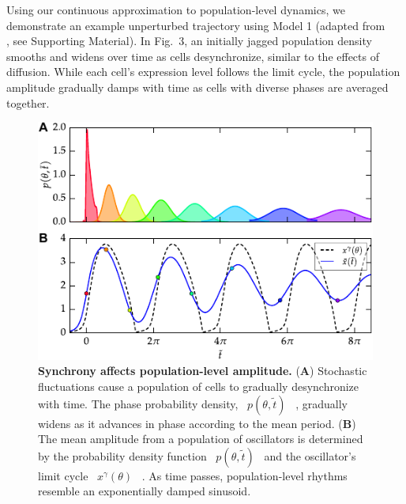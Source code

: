 \documentclass[11pt, letterpaper]{article}
\providecommand{\DIFadd}[1]{{\protect\color{blue}#1}} %
\providecommand{\DIFaddbegin}{} %
\providecommand{\DIFaddend}{} %
\providecommand{\DIFaddFL}[1]{\DIFadd{#1}} %
\providecommand{\DIFaddbeginFL}{} %
\providecommand{\DIFaddendFL}{} %
\begin{document}
\DIFadd{Using our continuous approximation to }\DIFaddend population-level \DIFaddbegin \DIFadd{dynamics, we demonstrate an example unperturbed trajectory using Model 1 (adapted from \mbox{%
\cite{Novak2008}
}%
, see Supporting Material).
In Fig.~3, an initially jagged population density smooths and widens over time as cells desynchronize, similar to }\DIFaddend the effects of \DIFaddbegin \DIFadd{diffusion.
While each cell's expression level follows the limit cycle, the population amplitude gradually damps with time as cells with diverse phases are averaged together}\DIFaddend .


\begin{figure}[tbp]
  \begin{center}
    \DIFaddbeginFL \includegraphics[width=.75\textwidth]{figures/figure_3.pdf}
    \DIFaddendFL \caption{
{\bfseries \DIFaddbeginFL \DIFaddFL{Synchrony affects population-level }\DIFaddendFL amplitude.\DIFaddbeginFL }
\DIFaddendFL ({\bfseries A}) \DIFaddbeginFL \DIFaddFL{Stochastic fluctuations cause a }\DIFaddendFL population \DIFaddbeginFL \DIFaddFL{of cells }\DIFaddendFL to \DIFaddbeginFL \DIFaddFL{gradually desynchronize with time}\DIFaddendFL .
The \DIFaddbeginFL \DIFaddFL{phase probability density}\DIFaddendFL , \DIFaddbeginFL \DIFaddFL{\mbox{%
$p(\theta, \tilde{t})$
}%
}\DIFaddendFL , \DIFaddbeginFL \DIFaddFL{gradually widens as it advances in phase according }\DIFaddendFL to the \DIFaddbeginFL \DIFaddFL{mean period}\DIFaddendFL .
({\bfseries B}) \DIFaddbeginFL \DIFaddFL{The mean }\DIFaddendFL amplitude from a \DIFaddbeginFL \DIFaddFL{population of oscillators is determined by the probability density function \mbox{%
$p(\theta, \tilde{t})$
}%
and the oscillator's }\DIFaddendFL limit cycle \DIFaddbeginFL \DIFaddFL{\mbox{%
$x^\gamma(\theta)$
}%
}\DIFaddendFL .
\DIFaddbeginFL \DIFaddFL{As }\DIFaddendFL time \DIFaddbeginFL \DIFaddFL{passes, population-level rhythms resemble an exponentially damped sinusoid}\DIFaddendFL .}
  \end{center}
\end{figure}
\end{document}
